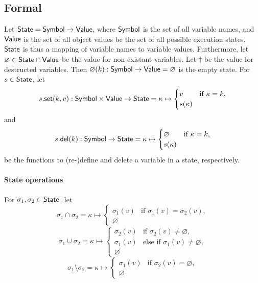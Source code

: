 \subsection{Formal}

Let $\mathsf{State} = \mathsf{Symbol} \to \mathsf{Value}$, where $\mathsf{Symbol}$ is the set of all variable names, and $\mathsf{Value}$ is the set of all object values be the set of all possible execution states.
$\mathsf{State}$ is thus a mapping of variable names to variable values.
Furthermore, let $\varnothing \in \mathsf{State} \cap \mathsf{Value}$ be the value for non-existant variables.
Let $\dagger$ be the value for destructed variables.
Then $\varnothing(k): \mathsf{Symbol} \to \mathsf{Value} = \varnothing$ is the empty state.
For $s \in \mathsf{State}$, let
$$
s.\mathsf{set}(k, v): \mathsf{Symbol} \times \mathsf{Value} \to \mathsf{State} =
	\kappa \mapsto \begin{cases}
		v & \text{if } \kappa = k,\\
		s(\kappa)
\end{cases}$$
and
$$
s.\mathsf{del}(k): \mathsf{Symbol} \to \mathsf{State} = \kappa \mapsto \begin{cases}
	\varnothing & \text{if } \kappa = k,\\
	s(\kappa)
\end{cases}
$$
be the functions to (re-)define and delete a variable in a state, respectively.

\paragraph{State operations}
For $\sigma_1, \sigma_2 \in \mathsf{State}$, let
$$
	\sigma_1 \cap \sigma_2 =
		\kappa \mapsto \begin{cases}
			\sigma_1(v) &\text{if } \sigma_1(v) = \sigma_2(v),\\
			\varnothing
		\end{cases}
$$
$$
	\sigma_1 \cup \sigma_2 =
		\kappa \mapsto \begin{cases}
			\sigma_2(v) &\text{if } \sigma_2(v) \neq \varnothing,\\
			\sigma_1(v) &\text{else if } \sigma_1(v) \neq \varnothing,\\
			\varnothing
		\end{cases}
$$
$$
	\sigma_1 \setminus \sigma_2 =
		\kappa \mapsto \begin{cases}
			\sigma_1(v) &\text{if } \sigma_2(v) = \varnothing,\\
			\varnothing
		\end{cases}
$$

